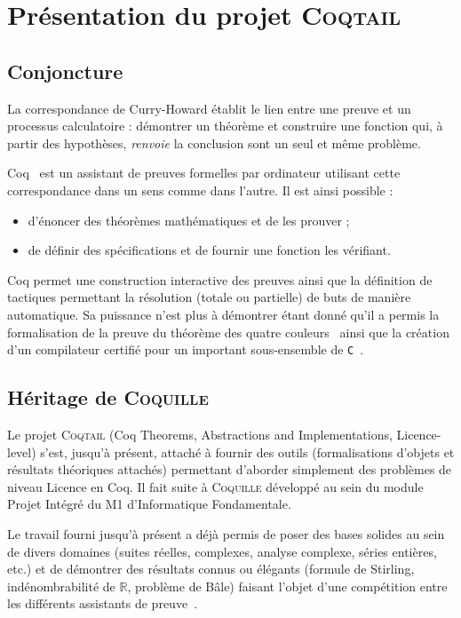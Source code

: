 \documentclass[11pt]{article}
\newcommand{\coqtail}{\textsc{Coqtail}}
\newcommand{\coquille}{\textsc{Coquille}}
\begin{document}
\section{Présentation du projet \coqtail{}}

\subsection{Conjoncture}

La correspondance de Curry-Howard établit le lien entre une preuve et un processus calculatoire : démontrer un théorème et construire une fonction qui, à partir des hypothèses, \emph{renvoie} la conclusion sont un seul et même problème.

Coq~\cite{L:BC04} est un assistant de preuves formelles par ordinateur utilisant cette correspondance dans un sens comme dans l'autre. Il est ainsi possible :
\begin{itemize}
  \item d'énoncer des théorèmes mathématiques et de les prouver ;
  \item de définir des spécifications et de fournir une fonction les vérifiant.
\end{itemize}

Coq permet une construction interactive des preuves ainsi que la définition de tactiques permettant la résolution (totale ou partielle) de buts de manière automatique. Sa puissance n'est plus à démontrer étant donné qu'il a permis la formalisation de la preuve du théorème des quatre couleurs~\cite{Gonthier07} ainsi que la création d'un compilateur certifié pour un important sous-ensemble de \texttt{C}~\cite{compcert}.

\subsection{Héritage de \coquille{}}

Le projet \coqtail{} (Coq Theorems, Abstractions and Implementations, Licence-level) s'est, jusqu'à présent, attaché à fournir des outils (formalisations d'objets et résultats théoriques attachés) permettant d'aborder simplement des problèmes de niveau Licence en Coq. Il fait suite à \coquille{} développé au sein du module Projet Intégré du M1 d'Informatique Fondamentale.

Le travail fourni jusqu'à présent a déjà permis de poser des bases solides au sein de divers domaines (suites réelles, complexes, analyse complexe, séries entières, etc.) et de démontrer des résultats connus ou élégants (formule de Stirling, indénombrabilité de $\mathbb{R}$, problème de Bâle) faisant l'objet d'une compétition entre les différents assistants de preuve~\cite{Freek}.
\end{document}
